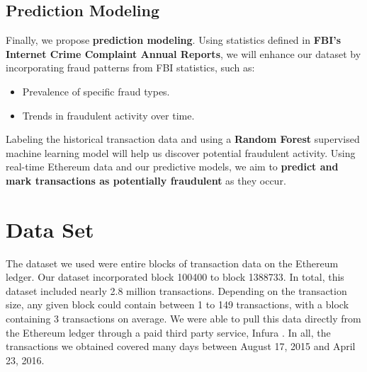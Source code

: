 \documentclass[sigconf]{acmart}
\begin{document}
\subsection{Prediction Modeling}
Finally, we propose \textbf{prediction modeling}. Using statistics defined in \textbf{FBI’s Internet Crime Complaint Annual Reports}, we will enhance our dataset by incorporating fraud patterns from FBI statistics, such as:
\begin{itemize}
    \item Prevalence of specific fraud types.
    \item Trends in fraudulent activity over time.
\end{itemize}
Labeling the historical transaction data and using a \textbf{Random Forest} supervised machine learning model will help us discover potential fraudulent activity. Using real-time Ethereum data and our predictive models, we aim to \textbf{predict and mark transactions as potentially fraudulent} as they occur.


\section{Data Set}

The dataset we used were entire blocks of transaction data on the Ethereum ledger. Our dataset incorporated block 100400 to block 1388733. In total, this dataset included nearly 2.8 million transactions. Depending on the transaction size, any given block could contain between 1 to 149 transactions, with a block containing 3 transactions on average. We were able to pull this data directly from the Ethereum ledger through a paid third party service, Infura \cite{InfuraURL}. In all, the transactions we obtained covered many days between August 17, 2015 and April 23, 2016. 
\end{document}
